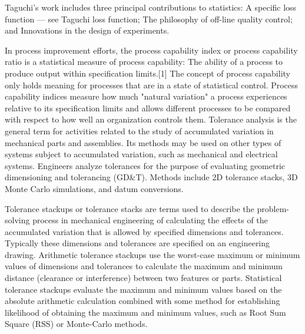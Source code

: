 Taguchi's work includes three principal contributions to statistics:
 A specific loss function — see Taguchi loss function;
 The philosophy of off-line quality control; and
 Innovations in the design of experiments.

In process improvement efforts, the process capability index or process capability ratio is a statistical measure of process capability: The ability of a process to produce output within specification limits.[1] The concept of process capability only holds meaning for processes that are in a state of statistical control. Process capability indices measure how much "natural variation" a process experiences relative to its specification limits and allows different processes to be compared with respect to how well an organization controls them.
Tolerance analysis is the general term for activities related to the study of accumulated variation in mechanical parts and assemblies. Its methods may be used on other types of systems subject to accumulated variation, such as mechanical and electrical systems. Engineers analyze tolerances for the purpose of evaluating geometric dimensioning and tolerancing (GD&T). Methods include 2D tolerance stacks, 3D Monte Carlo simulations, and datum conversions.
 
Tolerance stackups or tolerance stacks are terms used to describe the problem-solving process in mechanical engineering of calculating the effects of the accumulated variation that is allowed by specified dimensions and tolerances. Typically these dimensions and tolerances are specified on an engineering drawing. Arithmetic tolerance stackups use the worst-case maximum or minimum values of dimensions and tolerances to calculate the maximum and minimum distance (clearance or interference) between two features or parts. Statistical tolerance stackups evaluate the maximum and minimum values based on the absolute arithmetic calculation combined with some method for establishing likelihood of obtaining the maximum and minimum values, such as Root Sum Square (RSS) or Monte-Carlo methods.
 
